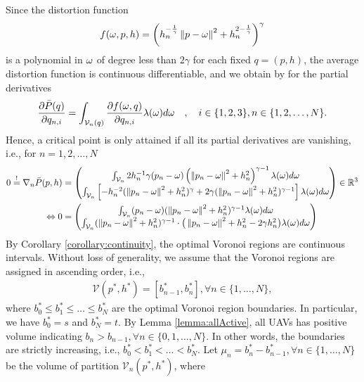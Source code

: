 \documentclass[12pt,onecolumn,journal,draftclsnofoot,letterpaper]{IEEEtran}
\newcommand{\df}{\ensuremath{\lam}}         %
\newcommand{\bQ}{\ensuremath{q}}          %
\newcommand{\Pbar}{\ensuremath{\bar{P}}}         %
\newcommand{\Vor}{\ensuremath{\mathcal{V}}}         %
\begin{document}
Since the distortion function 
\begin{align}
  f(\omega,p,h)= \left(h_n^{-\frac{1}{\gamma}} \left\|p-\omega\right\| ^2 + h_n^{2-\frac{1}{\gamma}}\right)^{\gamma}
\end{align}  
is a polynomial in $\omega$ of degree less than $2\gamma$ for each fixed $\bQ=(p,h)$, the average distortion function is continuous
differentiable, and we obtain by \cite[Thm.1]{WJ18} for the partial derivatives 
%
\begin{align}
  \frac{\partial \Pbar(q)}{\partial q_{n,i}} = \int_{\Vor_n(q)} \frac{\partial f(\ome,q)}{\partial q_{n,i}}
  \df(\ome)d\ome\quad,\quad i\in\{1,2,3\},n\in\{1,2,\dots,N\}.
\end{align}
%
Hence, a critical point is only attained if all its partial derivatives are vanishing, i.e.,  for  $n=1,2,\dots,N$ 
%
\begin{align}
 0\overset{!}{=} \nabla_n \Pbar(p,h) &= \begin{pmatrix} 
   \int_{\Vor_n} 2h_n^{-1} \gam (p_{n}-\ome)  \left(\Norm{p_n-\ome}^2 +h_n^2\right)^{\gam-1} 
    \df(\ome)d \ome\\
    \int_{\Vor_n} \left[-h_n^{-2}(\Norm{p_n-\ome}^2 + h_n^2)^{\gam} + 2\gam 
    (\Norm{p_n-\ome}^2 +h_n^2)^{\gam-1}\right]
    \df(\ome)d \ome
  \end{pmatrix} \in\R^3\notag\\
\LRA 0&= \begin{pmatrix}
  \int_{\Vor_n} (p_{n}-\ome) (\Norm{p_n-\ome}^2 +h_n^2)^{\gam-1} \df(\ome)d \ome\\
  \int_{\Vor_n} (\Norm{p_n-\ome}^2 +h_n^2)^{\gam-1}\cdot \big(\Norm{p_n-\ome}^2+h_n^2 - 2\gam h_n^2 \big)
  \df(\ome)d \ome
  \end{pmatrix}\label{eq:gradient}
\end{align}
%
By Corollary \ref{corollary:continuity}, the optimal Voronoi regions are continuous intervals. 
Without loss of generality, we assume that the Voronoi regions are assigned in ascending order, i.e., 
%
\begin{align}
\Vor(p^*, h^*)=[b^*_{n-1}, b^*_n], \forall n\in\{1,\dots,N\},
\label{eq:1DoptV}
\end{align}
%
where $b^*_0\le b^*_1\le\dots\le b^*_N$ are the optimal Voronoi region boundaries. In particular, we have $b^*_0=s$ and
$b^*_N=t$.  By Lemma \ref{lemma:allActive}, all UAVs has positive volume indicating $b_n > b_{n-1}, \forall
n\in\{0,1,\dots,N\}$.  In other words, the boundaries are strictly increasing, i.e., $b^*_0< b^*_1<\dots< b^*_N$.  Let
$\mu_n=b^*_n-b^*_{n-1}, \forall n\in\{1,\dots,N\}$ be the volume of partition $\Vor_n(p^*, h^*)$, where
\end{document}
